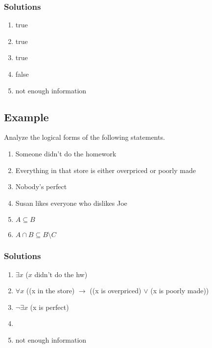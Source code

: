 \documentclass[12pt, letterpaper]{article}
\begin{document}
    \subsubsection*{Solutions}

    \begin{enumerate}
        \item true
        \item true
        \item true
        \item false
        \item not enough information
    \end{enumerate}

    \subsection{Example}

    Analyze the logical forms of the following statements.

    \begin{enumerate}
        \item Someone didn't do the homework
        \item Everything in that store is either overpriced or poorly made
        \item Nobody's perfect
        \item Susan likes everyone who dislikes Joe
        \item $A \subseteq B$
        \item $A \cap B \subseteq B \setminus C$
    \end{enumerate}

    \subsubsection*{Solutions}

    \begin{enumerate}
        \item $\exists x$ ($x$ didn't do the hw)
        \item $\forall x$ ((x in the store) $\rightarrow$ ((x is overpriced) $\lor$ (x is poorly made))
        \item $\neg \exists x$ (x is perfect)
        \item 
        \item not enough information
    \end{enumerate}
\end{document}
